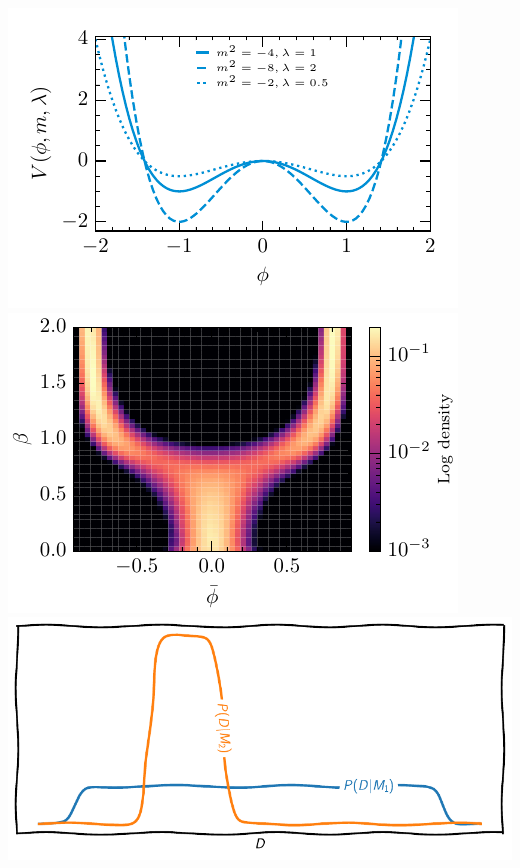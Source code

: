 \documentclass[aspectratio=169]{beamer}
\begin{document}
\begin{frame}
\begin{columns}
    \end{columns}
    \includegraphics[height=0.2\textwidth]{figures/potential_shape}%
    \includegraphics[height=0.2\textwidth]{figures/2d_phase}%
    \includegraphics[height=0.2\textwidth]{figures/popper}
\end{frame}
\end{document}
